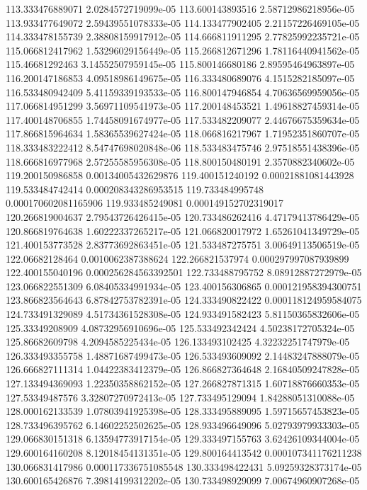 {113.333476889071 2.0284572719099e-05
113.600143893516 2.58712986218956e-05
113.933477649072 2.59439551078333e-05
114.133477902405 2.21157226469105e-05
114.333478155739 2.38808159917912e-05
114.666811911295 2.77825992235721e-05
115.066812417962 1.53296029156449e-05
115.266812671296 1.78116440941562e-05
115.46681292463 3.14552507959145e-05
115.800146680186 2.89595464963897e-05
116.200147186853 4.09518986149675e-05
116.333480689076 4.1515282185097e-05
116.533480942409 5.41159339193533e-05
116.800147946854 4.70636569959056e-05
117.066814951299 3.56971109541973e-05
117.200148453521 1.49618827459314e-05
117.400148706855 1.74458091674977e-05
117.533482209077 2.44676675359634e-05
117.866815964634 1.58365539627424e-05
118.066816217967 1.71952351860707e-05
118.333483222412 8.54747698020848e-06
118.533483475746 2.97518551438396e-05
118.666816977968 2.57255585956308e-05
118.800150480191 2.3570882340602e-05
119.200150986858 0.00134005432629876
119.400151240192 0.00021881081443928
119.533484742414 0.000208343286953515
119.733484995748 0.000170602081165906
119.933485249081 0.000149152702319017
120.266819004637 2.79543726426415e-05
120.733486262416 4.47179413786429e-05
120.866819764638 1.60222337265217e-05
121.066820017972 1.65261041349729e-05
121.400153773528 2.83773692863451e-05
121.533487275751 3.00649113506519e-05
122.06682128464 0.0010062387388624
122.266821537974 0.000297997087939899
122.400155040196 0.000256284563392501
122.733488795752 8.08912887272979e-05
123.066822551309 6.08405334991934e-05
123.400156306865 0.000121958394300751
123.866823564643 6.87842753782391e-05
124.333490822422 0.000118124959584075
124.733491329089 4.51734361528308e-05
124.933491582423 5.81150365832606e-05
125.33349208909 4.08732956910696e-05
125.533492342424 4.50238172705324e-05
125.86682609798 4.2094585225434e-05
126.133493102425 4.32232251747979e-05
126.333493355758 1.48871687499473e-05
126.533493609092 2.14483247888079e-05
126.666827111314 1.04422383412379e-05
126.866827364648 2.16840509247828e-05
127.133494369093 1.22350358862152e-05
127.266827871315 1.60718876660353e-05
127.53349487576 3.32807270972413e-05
127.733495129094 1.84288051310088e-05
128.000162133539 1.07803941925398e-05
128.333495889095 1.59715657453823e-05
128.733496395762 6.14602252502625e-05
128.933496649096 5.02793979933303e-05
129.066830151318 6.13594773917154e-05
129.333497155763 3.62426109344004e-05
129.600164160208 8.12018454131351e-05
129.800164413542 0.000107341176211238
130.066831417986 0.000117336751085548
130.333498422431 5.09259328373174e-05
130.600165426876 7.39814199312202e-05
130.733498929099 7.00674960907268e-05
}
